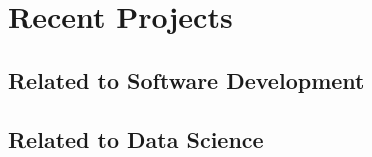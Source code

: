\documentclass[a4paper,11pt]{article}
\begin{document}
\section{Recent Projects}
\subsection*{Related to Software Development}
 
 \subsection*{Related to Data Science}
 
 


\end{document}

